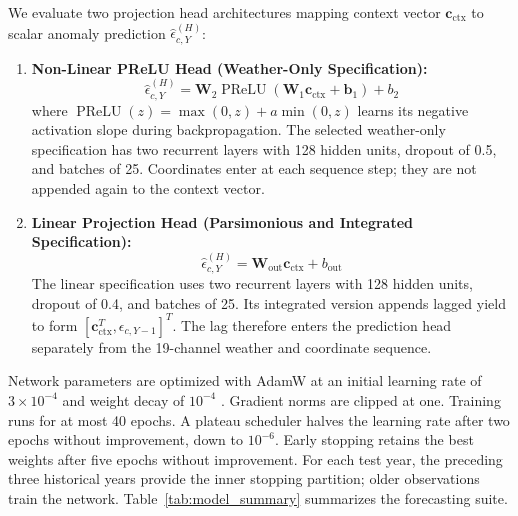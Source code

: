 We evaluate two projection head architectures mapping context vector $\mathbf{c}_{\text{ctx}}$ to scalar anomaly prediction $\hat{\epsilon}_{c,Y}^{(H)}$:
\begin{enumerate}
    \item \textbf{Non-Linear PReLU Head (Weather-Only Specification):}
    \begin{equation}
        \hat{\epsilon}_{c,Y}^{(H)} = \mathbf{W}_2 \operatorname{PReLU}\left(\mathbf{W}_1 \mathbf{c}_{\text{ctx}} + \mathbf{b}_1\right) + b_2
        \label{eq:lstm_prelu_head}
    \end{equation}
    where $\operatorname{PReLU}(z)=\max(0,z)+a\min(0,z)$ learns its negative activation slope during backpropagation. The selected weather-only specification has two recurrent layers with 128 hidden units, dropout of 0.5, and batches of 25. Coordinates enter at each sequence step; they are not appended again to the context vector.
    \item \textbf{Linear Projection Head (Parsimonious and Integrated Specification):}
    \begin{equation}
        \hat{\epsilon}_{c,Y}^{(H)} = \mathbf{W}_{\text{out}} \mathbf{c}_{\text{ctx}} + b_{\text{out}}
        \label{eq:lstm_linear_head}
    \end{equation}
    The linear specification uses two recurrent layers with 128 hidden units, dropout of 0.4, and batches of 25. Its integrated version appends lagged yield to form $[\mathbf{c}_{\text{ctx}}^T,\epsilon_{c,Y-1}]^T$. The lag therefore enters the prediction head separately from the 19-channel weather and coordinate sequence.
\end{enumerate}

Network parameters are optimized with AdamW at an initial learning rate of $3\times10^{-4}$ and weight decay of $10^{-4}$ \citep{Geron2025}. Gradient norms are clipped at one. Training runs for at most 40 epochs. A plateau scheduler halves the learning rate after two epochs without improvement, down to $10^{-6}$. Early stopping retains the best weights after five epochs without improvement. For each test year, the preceding three historical years provide the inner stopping partition; older observations train the network. Table~\ref{tab:model_summary} summarizes the forecasting suite.

